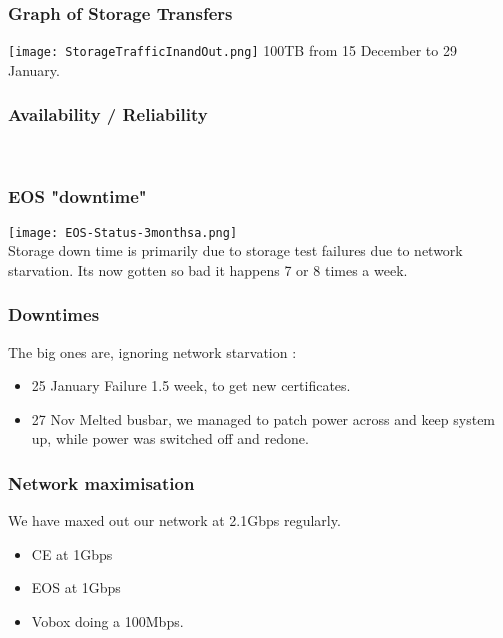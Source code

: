 \documentclass{beamer}
\begin{document}
\begin{frame}
    \frametitle{Graph of Storage Transfers}
    \texttt{[image: StorageTrafficInandOut.png]}
    100TB from 15 December to 29 January.
\end{frame}
\begin{frame}
  \frametitle{Availability / Reliability}
    \newline
    \\
\vspace{0.5cm}
\end{frame}
\begin{frame}
    \frametitle{EOS "downtime"}
    \texttt{[image: EOS-Status-3monthsa.png]} \\
Storage down time is primarily due to storage test failures due to network starvation. Its now gotten so bad it happens 7 or 8 times a week.
\end{frame}
\begin{frame}
\frametitle{Downtimes}
The big ones are, ignoring network starvation :
\begin{itemize}
    \item 25 January Failure 1.5 week, to get new certificates.
  \item 27 Nov Melted busbar, we managed to patch power across and keep system up, while power was switched off and redone.
\end{itemize}
\end{frame}

\begin{frame}
    \frametitle{Network maximisation}
    We have maxed out our network at 2.1Gbps regularly.
    \begin{itemize}
            \item CE at 1Gbps
                \item EOS at 1Gbps
                \item Vobox doing a 100Mbps.
    \end{itemize}
\end{frame} 
\end{document}
